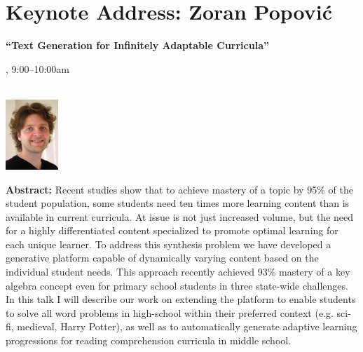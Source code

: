 \section{Keynote Address: Zoran Popović}
\begin{center}

\begin{Large}
{\bfseries\Large ``Text Generation for Infinitely Adaptable Curricula''}
\vspace{1em}\par
\end{Large}

\daydateyear, 9:00--10:00am \vspace{1em}\\
\PlenaryLoc \\
\vspace{1em}\par
\includegraphics[height=100px]{content/tuesday/popovic-headshot.jpg}
\end{center}

\noindent
{\bfseries Abstract:} Recent studies show that to achieve mastery of a
topic by 95\% of the student population, some students need ten times
more learning content than is available in current curricula.  At
issue is not just increased volume, but the need for a highly
differentiated content specialized to promote optimal learning for
each unique learner.  To address this synthesis problem we have
developed a generative platform capable of dynamically varying content
based on the individual student needs.  This approach recently
achieved 93\% mastery of a key algebra concept even for primary school
students in three state-wide challenges.  In this talk I will describe
our work on extending the platform to enable students to solve all
word problems in high-school within their preferred context
(e.g. sci-fi, medieval, Harry Potter), as well as to automatically
generate adaptive learning progressions for reading comprehension
curricula in middle school.

\vspace{3em}\par 

\vfill
\noindent

